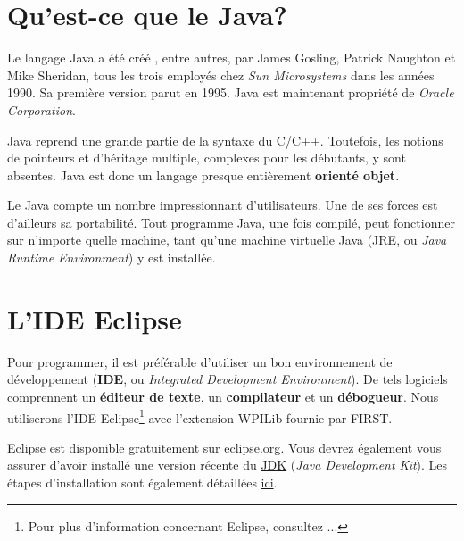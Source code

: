 \documentclass[12pt]{report}
\begin{document}
%
\section{Qu'est-ce que le Java?}
%
%
Le langage Java a été créé , entre autres, par James Gosling, Patrick Naughton et Mike Sheridan, tous les trois employés chez \emph{Sun Microsystems} dans les années 1990. Sa première version parut en 1995. Java est maintenant propriété de \emph{Oracle Corporation}.

Java reprend une grande partie de la syntaxe du C/C++. Toutefois, les notions de pointeurs et d'héritage multiple, complexes pour les débutants, y sont absentes. Java est donc un langage presque entièrement \textbf{orienté objet}.

Le Java compte un nombre impressionnant d'utilisateurs. Une de ses forces est d'ailleurs sa portabilité. Tout programme Java, une fois compilé, peut fonctionner sur n'importe quelle machine, tant qu'une machine virtuelle Java (JRE, ou \emph{Java Runtime Environment}) y est installée.





%
\section{L'IDE Eclipse}
%
Pour programmer, il est préférable d'utiliser un bon environnement de développement (\textbf{IDE}, ou \emph{Integrated Development Environment}). De tels logiciels comprennent un \textbf{éditeur de texte}, un \textbf{compilateur} et un \textbf{débogueur}. Nous utiliserons l'IDE Eclipse\footnote{Pour plus d'information concernant Eclipse, consultez ...} avec l'extension WPILib fournie par FIRST.

Eclipse est disponible gratuitement sur \href{https://www.eclipse.org}{eclipse.org}. Vous devrez également vous assurer d'avoir installé une version récente du \href{http://www.oracle.com/technetwork/java/javase/downloads/index.html}{JDK} (\emph{Java Development Kit}). Les étapes d'installation sont également détaillées \href{http://wpilib.screenstepslive.com/s/4485/m/13809/l/599681-installing-eclipse-c-java}{ici}.
\end{document}
